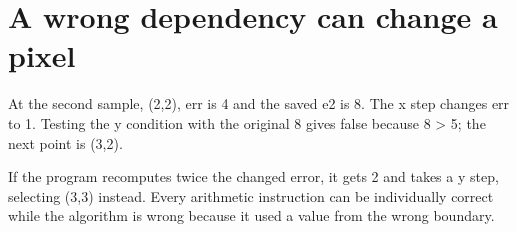 \section{A wrong dependency can change a
  pixel}\label{007-bresenham-line-x-frozen-a-wrong-dependency-can-change-a-pixel}

At the second sample, (2,2), err is 4 and the saved e2 is 8. The x step
changes err to 1. Testing the y condition with the original 8 gives
false because 8 \textgreater{} 5; the next point is (3,2).

If the program recomputes twice the changed error, it gets 2 and takes a
y step, selecting (3,3) instead. Every arithmetic instruction can be
individually correct while the algorithm is wrong because it used a
value from the wrong boundary.
